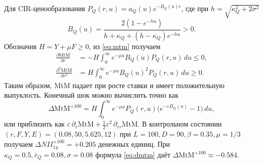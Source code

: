 \documentclass[11pt,a4paper]{article}
\begin{document}
Для CIR-ценообразования $P_Q(r,u)=a_Q(u)e^{-B_Q(u)r}$, где при
$h=\sqrt{\kappa_Q^2+2\sigma^2}$
\begin{equation}
 B_Q(u)=\frac{2(1-e^{-hu})}
 {h+\kappa_Q+(h-\kappa_Q)e^{-hu}}>0.
 \label{eq:cir-b}
\end{equation}
Обозначив $H=Y+\mu F\geq0$, из \eqref{eq:mtm} получаем
\begin{align}
 \frac{\partial\mathrm{MtM}}{\partial r}
 &=-H\int_0^\infty e^{-\mu u}B_Q(u)P_Q(r,u)\,du\leq0,
 \label{eq:mtm-delta}\\
 \frac{\partial^2\mathrm{MtM}}{\partial r^2}
 &=H\int_0^\infty e^{-\mu u}B_Q(u)^2P_Q(r,u)\,du\geq0.
 \label{eq:mtm-gamma}
\end{align}
Таким образом, MtM падает при росте ставки и имеет положительную
выпуклость. Конечный шок можно вычислить точно как
\begin{equation}
 \Delta\mathrm{MtM}^{+100}
 =H\int_0^\infty e^{-\mu u}P_Q(r,u)
       \bigl(e^{-\varepsilon B_Q(u)}-1\bigr)\,du,
 \label{eq:mtm-exact-shock}
\end{equation}
или приблизить как $\varepsilon\,\partial_r\mathrm{MtM}
+\tfrac12\varepsilon^2\,\partial_{rr}\mathrm{MtM}$.
В контрольном состоянии $(r,F,Y,E)=(0.08,50,5.625,12)$ при
$L=100,D=90,\beta=0.35,\mu=1/3$ получаем
$\Delta NII_{1y}^{+100}=+0.205$ денежных единиц. При
$\kappa_Q=0.5,\bar r_Q=0.08,\sigma=0.08$ формула \eqref{eq:dmtm}
даёт $\Delta\mathrm{MtM}^{+100}\approx-0.584$.
\end{document}
